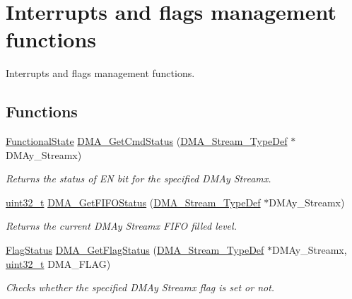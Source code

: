 \hypertarget{group___d_m_a___group4}{\section{Interrupts and flags management functions}
\label{group___d_m_a___group4}
}


Interrupts and flags management functions.  


\subsection*{Functions}
\begin{DoxyCompactItemize}
\item 
\hyperlink{group___exported__types_gac9a7e9a35d2513ec15c3b537aaa4fba1}{Functional\-State} \hyperlink{group___d_m_a___group4_gaa4d631cdd6cd020106435f30c0c6fb15}{D\-M\-A\-\_\-\-Get\-Cmd\-Status} (\hyperlink{struct_d_m_a___stream___type_def}{D\-M\-A\-\_\-\-Stream\-\_\-\-Type\-Def} $\ast$D\-M\-Ay\-\_\-\-Streamx)
\begin{DoxyCompactList}\small\item\em Returns the status of E\-N bit for the specified D\-M\-Ay Streamx. \end{DoxyCompactList}\item 
\hyperlink{stdint_8h_a435d1572bf3f880d55459d9805097f62}{uint32\-\_\-t} \hyperlink{group___d_m_a___group4_ga9893809a7067861ec111f7d712ebf28d}{D\-M\-A\-\_\-\-Get\-F\-I\-F\-O\-Status} (\hyperlink{struct_d_m_a___stream___type_def}{D\-M\-A\-\_\-\-Stream\-\_\-\-Type\-Def} $\ast$D\-M\-Ay\-\_\-\-Streamx)
\begin{DoxyCompactList}\small\item\em Returns the current D\-M\-Ay Streamx F\-I\-F\-O filled level. \end{DoxyCompactList}\item 
\hyperlink{group___exported__types_ga89136caac2e14c55151f527ac02daaff}{Flag\-Status} \hyperlink{group___d_m_a___group4_ga10cfc0fe31d64a1fd8fb3efb4ae2a411}{D\-M\-A\-\_\-\-Get\-Flag\-Status} (\hyperlink{struct_d_m_a___stream___type_def}{D\-M\-A\-\_\-\-Stream\-\_\-\-Type\-Def} $\ast$D\-M\-Ay\-\_\-\-Streamx, \hyperlink{stdint_8h_a435d1572bf3f880d55459d9805097f62}{uint32\-\_\-t} D\-M\-A\-\_\-\-F\-L\-A\-G)
\begin{DoxyCompactList}\small\item\em Checks whether the specified D\-M\-Ay Streamx flag is set or not. \end{DoxyCompactList}\item 

\end{DoxyCompactItemize}
